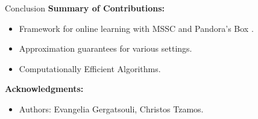 \documentclass{beamer}
\begin{document}

\begin{frame}{Conclusion}
\textbf{Summary of Contributions:}
\begin{itemize}
    \item Framework for online learning with MSSC and Pandora’s Box \cite{gergatsouli2022online}.
    \item Approximation guarantees for various settings.
    \item Computationally Efficient Algorithms.
\end{itemize}
\textbf{Acknowledgments:}
\begin{itemize}
    \item Authors: Evangelia Gergatsouli, Christos Tzamos.
\end{itemize}
\end{frame}



\end{document}
